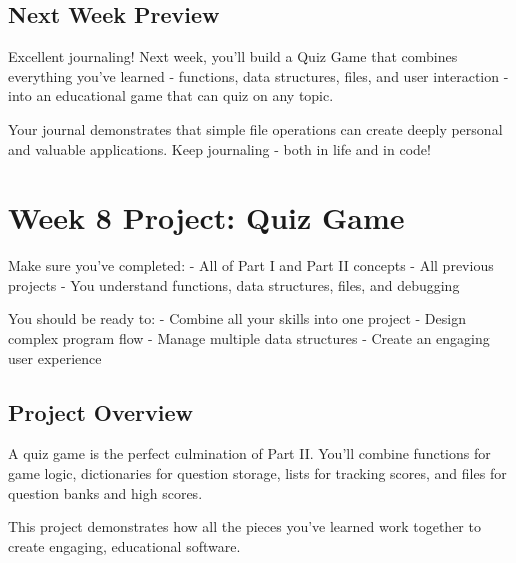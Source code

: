 \documentclass[
  letterpaper,
  DIV=11,
  numbers=noendperiod,
  oneside]{scrreprt}
\begin{document}
\section{Next Week Preview}\label{next-week-preview-5}

Excellent journaling! Next week, you'll build a Quiz Game that combines
everything you've learned - functions, data structures, files, and user
interaction - into an educational game that can quiz on any topic.

Your journal demonstrates that simple file operations can create deeply
personal and valuable applications. Keep journaling - both in life and
in code! 📖

\chapter{Week 8 Project: Quiz Game}\label{sec-project-quiz-game}

\begin{tcolorbox}[enhanced jigsaw, opacityback=0, colback=white, colframe=quarto-callout-important-color-frame, breakable, titlerule=0mm, coltitle=black, rightrule=.15mm, colbacktitle=quarto-callout-important-color!10!white, left=2mm, bottomtitle=1mm, bottomrule=.15mm, title=\textcolor{quarto-callout-important-color}{\faExclamation}\hspace{0.5em}{Before You Start}, opacitybacktitle=0.6, toptitle=1mm, leftrule=.75mm, arc=.35mm, toprule=.15mm]

Make sure you've completed: - All of Part I and Part II concepts - All
previous projects - You understand functions, data structures, files,
and debugging

You should be ready to: - Combine all your skills into one project -
Design complex program flow - Manage multiple data structures - Create
an engaging user experience

\end{tcolorbox}

\section{Project Overview}\label{project-overview-7}

A quiz game is the perfect culmination of Part II. You'll combine
functions for game logic, dictionaries for question storage, lists for
tracking scores, and files for question banks and high scores.

This project demonstrates how all the pieces you've learned work
together to create engaging, educational software.
\end{document}
